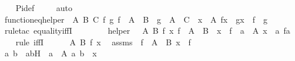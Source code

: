 \begin{isabellebody}
%
\isadelimproof
\ \ %
\endisadelimproof
%
\isatagproof
{}\isamarkupfalse%
\ Pi{\isacharunderscore}{\kern0pt}def\ \isanewline
\ \ \isamarkupfalse%
\ auto%
\endisatagproof
{\isafoldproof}%
%
\isadelimproof
\isanewline
%
\endisadelimproof
\isanewline
{}\isamarkupfalse%
\ function{\isacharunderscore}{\kern0pt}eq{\isacharunderscore}{\kern0pt}helper\ {\isacharcolon}{\kern0pt}\ {\isachardoublequoteopen}{\isasymAnd}A\ B\ C\ f\ g{\isachardot}{\kern0pt}\ f\ {\isasymin}\ A\ {\isasymrightarrow}\ B\ {\isasymLongrightarrow}\ g\ {\isasymin}\ A\ {\isasymrightarrow}\ C\ {\isasymLongrightarrow}\ {\isasymforall}x\ {\isasymin}\ A{\isachardot}{\kern0pt}\ f{\isacharbackquote}{\kern0pt}x\ {\isacharequal}{\kern0pt}\ g{\isacharbackquote}{\kern0pt}x\ {\isasymLongrightarrow}\ f\ {\isacharequal}{\kern0pt}\ g{\isachardoublequoteclose}\ \isanewline
%
\isadelimproof
\ \ %
\endisadelimproof
%
\isatagproof
{}\isamarkupfalse%
\ {\isacharparenleft}{\kern0pt}rule{\isacharunderscore}{\kern0pt}tac\ equality{\isacharunderscore}{\kern0pt}iffI{\isacharparenright}{\kern0pt}\isanewline
{}\isamarkupfalse%
\ {\isacharminus}{\kern0pt}\isanewline
\ \ \isanewline
\ \ \isamarkupfalse%
\ helper\ {\isacharcolon}{\kern0pt}\ \ {\isachardoublequoteopen}{\isasymAnd}A\ B\ f\ x{\isachardot}{\kern0pt}\ f\ {\isasymin}\ A\ {\isasymrightarrow}\ B\ {\isasymLongrightarrow}\ x\ {\isasymin}\ f\ {\isasymlongleftrightarrow}\ {\isacharparenleft}{\kern0pt}{\isasymexists}a\ {\isasymin}\ A{\isachardot}{\kern0pt}\ x\ {\isacharequal}{\kern0pt}\ {\isacharless}{\kern0pt}a{\isacharcomma}{\kern0pt}\ f{\isacharbackquote}{\kern0pt}a{\isachargreater}{\kern0pt}{\isacharparenright}{\kern0pt}{\isachardoublequoteclose}\ \isanewline
\ \ \isamarkupfalse%
\ {\isacharparenleft}{\kern0pt}rule\ iffI{\isacharparenright}{\kern0pt}\isanewline
\ \ \ \ \isamarkupfalse%
\ A\ B\ f\ x\ \isamarkupfalse%
\ assms\ {\isacharcolon}{\kern0pt}\ {\isachardoublequoteopen}f\ {\isasymin}\ A\ {\isasymrightarrow}\ B{\isachardoublequoteclose}\ {\isachardoublequoteopen}x\ {\isasymin}\ f{\isachardoublequoteclose}\ \isanewline
\ \ \ \ \isamarkupfalse%
\ \isamarkupfalse%
\ a\ b\ \ abH\ {\isacharcolon}{\kern0pt}\ {\isachardoublequoteopen}a\ {\isasymin}\ A{\isachardoublequoteclose}\ {\isachardoublequoteopen}{\isacharless}{\kern0pt}a{\isacharcomma}{\kern0pt}\ b{\isachargreater}{\kern0pt}\ {\isacharequal}{\kern0pt}\ x{\isachardoublequoteclose}\ \isamarkupfalse%

\end{isabellebody}
